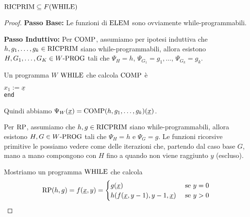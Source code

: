 \begin{theor}
	$\text{RICPRIM} \subseteq F(\text{WHILE})$
\end{theor}
\begin{proof}
	\textbf{Passo Base:} Le funzioni di $\text{ELEM}$ sono ovviamente while-programmabili.
	
	\textbf{Passo Induttivo:} Per $\text{COMP}$, assumiamo per ipotesi induttiva che $h,g_1, \dots, g_k \in \text{RICPRIM}$ siano while-programmabili, allora esistono $H, G_1, \dots, G_K \in W\text{-PROG}$ tali che $\Psi_H = h$, $\Psi_{G_1} = g_1, \dots$, $\Psi_{G_k} = g_k$.
    
	Un programma $W$ $\text{WHILE}$ che calcola $\text{COMP}$ è
	
	\begin{center}
		\begin{minipage}{0.85\textwidth}
			\begin{tcolorbox}[colback=white,sharp corners,boxrule=.3mm]
				\begin{algorithm}[H]
					\SetAlgoNoEnd
					$x_1 := \underline{x}$ \\
					\texttt{end}
				\end{algorithm}
			\end{tcolorbox}
		\end{minipage}
	\end{center}
	
	Quindi abbiamo $\Psi_W (\underline{x}) = \text{COMP} (h, g_1, \dots, g_k) (\underline{x})$.
	
	Per $\text{RP}$, assumiamo che $h,g \in \text{RICPRIM}$ siano while-programmabili, allora esistono $H,G \in W\text{-PROG}$ tali che $\Psi_H = h$ e $\Psi_G = g$. Le funzioni ricorsive primitive le possiamo vedere come delle iterazioni che, partendo dal caso base $G$, mano a mano compongono con $H$ fino a quando non viene raggiunto $y$ (escluso). 
    
    Mostriamo un programma $\text{WHILE}$ che calcola
	$$ 
	\text{RP} (h,g) = f(\underline{x}, y) = \begin{cases}
		g(\underline{x}) & \text{ se } y = 0 \\
		h(f(\underline{x}, y-1), y-1, \underline{x}) & \text{ se } y > 0
	\end{cases}
	$$
	

\end{proof}
